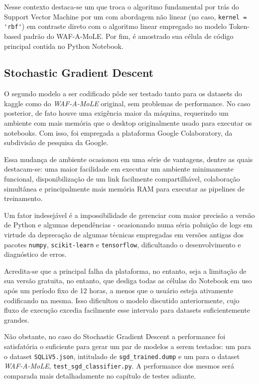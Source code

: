 Nesse contexto destaca-se um que troca o algoritmo fundamental por trás do Support Vector Machine por um com abordagem não linear (no caso, \verb+kernel = 'rbf'+) em contraste direto com o algoritmo linear empregado no modelo Token-based padrão do WAF-A-MoLE. Por fim, é amostrado sua célula de código principal contida no Python Notebook.

\label{sec:codigos:modelos}
\bigskip

\subsection{Stochastic Gradient Descent}
O segundo modelo a ser codificado pôde ser testado tanto para os datasets do kaggle como do \textit{WAF-A-MoLE} original, sem problemas de performance. No caso posterior, de fato houve uma exigência maior da máquina, requerindo um ambiente com mais memória que o desktop originalmente usado para executar os notebooks. Com isso, foi empregada a plataforma Google Colaboratory, da subdivisão de pesquisa da Google. 

Essa mudança de ambiente ocasionou em uma série de vantagens, dentre as quais destacam-se: uma maior facilidade em executar um ambiente minimamente funcional, disponibilização de um link facilmente compartilhável, colaboração simultânea e principalmente mais memória RAM para executar as pipelines de treinamento. 

Um fator indesejável é a impossibilidade de gerenciar com maior precisão a versão de Python e algumas dependências - ocasionando numa séria poluição de logs em virtude da deprecação de algumas técnicas empregadas em versões antigas dos pacotes \verb+numpy+, \verb+scikit-learn+ e \verb+tensorflow+, dificultando o desenvolvimento e diagnóstico de erros. 

Acredita-se que a principal falha da plataforma, no entanto, seja a limitação de sua versão gratuita, no entanto, que desliga todas as células do Notebook em uso após um período fixo de 12 horas, a menos que o usuário esteja ativamente codificando na mesma. Isso dificultou o modelo discutido anteriormente, cujo fluxo de execução excedia facilmente esse intervalo para datasets suficientemente grandes.

Não obstante, no caso do Stochastic Gradient Descent a performance foi satisfatória o suficiente para gerar um par de modelos a serem testados: um para o dataset \verb+SQLiV5.json+, intitulado de \verb+sgd_trained.dump+ e um para o dataset \textit{WAF-A-MoLE}, \verb+test_sgd_classifier.py+. A performance dos mesmos será comparada mais detalhadamente no capítulo de testes adiante. 

